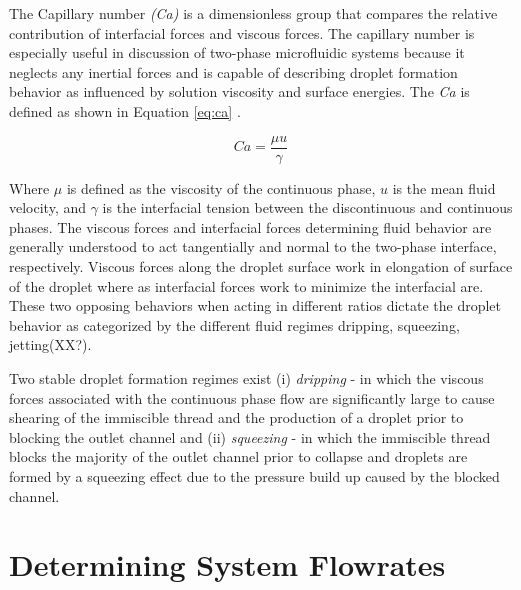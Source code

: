The Capillary number \emph{(Ca)} is a dimensionless group that compares the relative contribution of interfacial forces and viscous forces. The capillary number is especially useful in discussion of two-phase microfluidic systems because it neglects any inertial forces and is capable of describing droplet formation behavior as influenced by solution viscosity and surface energies.  The \emph{Ca} is defined as shown in Equation \vref{eq:ca} \cite{D??azNafr??a2013}.

\begin{equation}
Ca =\frac {\mu u}{\gamma}
\label{eq:ca}
\end{equation}

Where $\mu$ is defined as the viscosity of the continuous phase, $u$ is the mean fluid velocity, and $\gamma$ is the interfacial tension between the discontinuous and continuous phases. The viscous forces and interfacial forces determining fluid behavior are generally understood to act tangentially and normal to the two-phase interface, respectively. Viscous forces along the droplet surface work in elongation of surface of the droplet where as interfacial forces work to minimize the interfacial are. These two opposing behaviors when acting in different ratios dictate the droplet behavior as categorized by the different fluid regimes dripping, squeezing, jetting(XX?)\cite{Shui2007}.

Two stable droplet formation regimes exist (i) \emph{dripping} - in which the viscous forces associated with the continuous phase flow are significantly large to cause shearing of the immiscible thread and the production of a droplet prior to blocking the outlet channel and (ii) \emph{squeezing} - in which the immiscible thread blocks the majority of the outlet channel prior to collapse and droplets are formed by a squeezing effect due to the pressure build up caused by the blocked channel.

\section{Determining System Flowrates}


